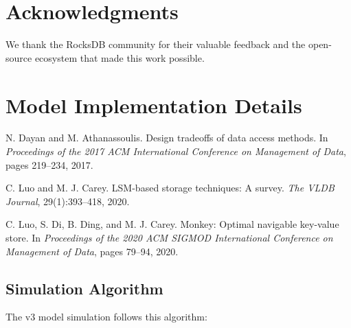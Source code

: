 \documentclass[11pt,twocolumn]{article}
\begin{document}
\section*{Acknowledgments}

We thank the RocksDB community for their valuable feedback and the open-source ecosystem that made this work possible.


\appendix

\section{Model Implementation Details}

\begin{thebibliography}{9}
N. Dayan and M. Athanassoulis.
\newblock Design tradeoffs of data access methods.
\newblock In \emph{Proceedings of the 2017 ACM International Conference on Management of Data}, pages 219--234, 2017.

C. Luo and M. J. Carey.
\newblock LSM-based storage techniques: A survey.
\newblock \emph{The VLDB Journal}, 29(1):393--418, 2020.

C. Luo, S. Di, B. Ding, and M. J. Carey.
\newblock Monkey: Optimal navigable key-value store.
\newblock In \emph{Proceedings of the 2020 ACM SIGMOD International Conference on Management of Data}, pages 79--94, 2020.
\end{thebibliography}

\subsection{Simulation Algorithm}

The v3 model simulation follows this algorithm:
\end{document}
